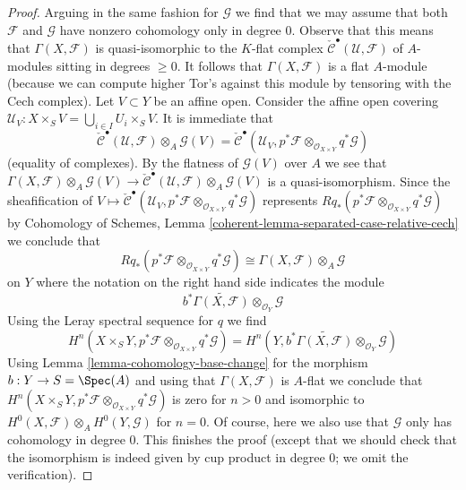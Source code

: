 \begin{proof}
\medskip\noindent
Arguing in the same fashion for $\mathcal{G}$ we find that we
may assume that both $\mathcal{F}$ and $\mathcal{G}$
have nonzero cohomology only in degree $0$.
Observe that this means that $\Gamma(X, \mathcal{F})$
is quasi-isomorphic to the $K$-flat complex
$\check{\mathcal{C}}^\bullet(\mathcal{U}, \mathcal{F})$
of $A$-modules sitting in degrees $\geq 0$.
It follows that $\Gamma(X, \mathcal{F})$ is a flat $A$-module
(because we can compute higher Tor's against this module
by tensoring with the Cech complex).
Let $V \subset Y$ be an affine open. Consider the affine open covering
$\mathcal{U}_V : X \times_S V = \bigcup_{i \in I} U_i \times_S V$.
It is immediate that
$$
\check{\mathcal{C}}^\bullet(\mathcal{U}, \mathcal{F})
\otimes_A \mathcal{G}(V) =
\check{\mathcal{C}}^\bullet(\mathcal{U}_V,
p^*\mathcal{F} \otimes_{\mathcal{O}_{X \times Y}}
q^*\mathcal{G})
$$
(equality of complexes). By the flatness of $\mathcal{G}(V)$
over $A$ we see that
$\Gamma(X, \mathcal{F}) \otimes_A \mathcal{G}(V) \to
\check{\mathcal{C}}^\bullet(\mathcal{U}, \mathcal{F})
\otimes_A \mathcal{G}(V)$ is a quasi-isomorphism.
Since the sheafification of
$V \mapsto \check{\mathcal{C}}^\bullet(\mathcal{U}_V,
p^*\mathcal{F} \otimes_{\mathcal{O}_{X \times Y}}
q^*\mathcal{G})$ represents
$Rq_*(p^*\mathcal{F} \otimes_{\mathcal{O}_{X \times Y}} q^*\mathcal{G})$
by Cohomology of Schemes, Lemma
\ref{coherent-lemma-separated-case-relative-cech}
we conclude that
$$
Rq_*(p^*\mathcal{F} \otimes_{\mathcal{O}_{X \times Y}} q^*\mathcal{G})
\cong
\Gamma(X, \mathcal{F}) \otimes_A \mathcal{G}
$$
on $Y$ where the notation on the right hand side indicates the module
$$
b^*\widetilde{\Gamma(X, \mathcal{F})} \otimes_{\mathcal{O}_Y} \mathcal{G}
$$
Using the Leray spectral sequence for $q$ we find
$$
H^n(X \times_S Y, p^*\mathcal{F} \otimes_{\mathcal{O}_{X \times Y}}
q^*\mathcal{G}) =
H^n(Y,
b^*\widetilde{\Gamma(X, \mathcal{F})} \otimes_{\mathcal{O}_Y} \mathcal{G})
$$
Using Lemma \ref{lemma-cohomology-base-change} for the morphism
$b : Y \to S = \Spec(A)$ and using that $\Gamma(X, \mathcal{F})$
is $A$-flat we conclude that
$H^n(X \times_S Y, p^*\mathcal{F} \otimes_{\mathcal{O}_{X \times Y}}
q^*\mathcal{G})$ is zero for $n > 0$ and isomorphic to
$H^0(X, \mathcal{F}) \otimes_A H^0(Y, \mathcal{G})$ for $n = 0$.
Of course, here we also use that $\mathcal{G}$ only has
cohomology in degree $0$.
This finishes the proof (except that we should check that the
isomorphism is indeed given by cup product in degree $0$; we omit
the verification).
\end{proof}







